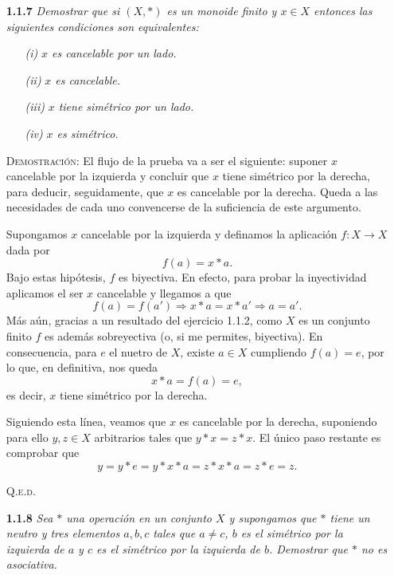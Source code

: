 \documentclass{article}
\begin{document}
\begin{enumerate}
    \item[\textbf{1.1.7}] \textit{Demostrar que si $(X, *)$ es un monoide finito y $x \in X$ entonces las siguientes condiciones son equivalentes:}

    \begin{itemize}
        \item[\textit{(i)}] \textit{$x$ es cancelable por un lado.}
        \item[\textit{(ii)}] \textit{$x$ es cancelable.}
        \item[\textit{(iii)}] \textit{$x$ tiene simétrico por un lado.}
        \item[\textit{(iv)}] \textit{$x$ es simétrico.}
    \end{itemize}

    \vspace{7px}

    \textsc{Demostración}: El flujo de la prueba va a ser el siguiente: suponer $x$ cancelable por la izquierda y concluir que $x$ tiene simétrico por la derecha, para deducir, seguidamente, que $x$ es cancelable por la derecha. Queda a las necesidades de cada uno convencerse de la suficiencia de este argumento.

    Supongamos $x$ cancelable por la izquierda y definamos la aplicación $f : X \to X$ dada por \[f(a) = x * a.\] Bajo estas hipótesis, $f$ es biyectiva. En efecto, para probar la inyectividad aplicamos el ser $x$ cancelable y llegamos a que \[f(a) = f(a') \Rightarrow x * a = x * a' \Rightarrow a = a'.\] Más aún, gracias a un resultado del ejercicio 1.1.2, como $X$ es un conjunto finito $f$ es además sobreyectiva (o, si me permites, biyectiva). 
    En consecuencia, para $e$ el nuetro de $X$, existe $a \in X$ cumpliendo $f(a) = e$, por lo que, en definitiva, nos queda \[x * a = f(a) = e,\] es decir, $x$ tiene simétrico por la derecha.

    Siguiendo esta línea, veamos que $x$ es cancelable por la derecha, suponiendo para ello $y, z \in X$ arbitrarios tales que $y * x = z * x$. El único paso restante es comprobar que \[y = y * e = y * x * a = z * x * a = z * e = z.\]

    \hfill{\textsc{Q.e.d.}}

    \vspace{12px}

    \item[\textbf{1.1.8}] \textit{Sea $*$ una operación en un conjunto $X$ y supongamos que $*$ tiene un neutro y tres elementos $a, b, c$ tales que $a \neq c$, $b$ es el simétrico por la izquierda de $a$ y $c$ es el simétrico por la izquierda de $b$. Demostrar que $*$ no es asociativa.}


\end{enumerate}
\end{document}
